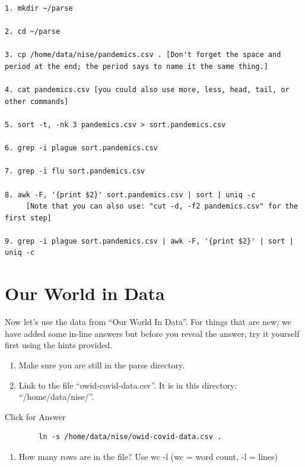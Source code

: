 \documentclass[
]{book}
\providecommand{\tightlist}{%
  \setlength{\itemsep}{0pt}\setlength{\parskip}{0pt}}
\begin{document}
\begin{verbatim}
1. mkdir ~/parse

2. cd ~/parse

3. cp /home/data/nise/pandemics.csv . [Don't forget the space and period at the end; the period says to name it the same thing.]

4. cat pandemics.csv [you could also use more, less, head, tail, or other commands]

5. sort -t, -nk 3 pandemics.csv > sort.pandemics.csv

6. grep -i plague sort.pandemics.csv

7. grep -i flu sort.pandemics.csv

8. awk -F, '{print $2}' sort.pandemics.csv | sort | uniq -c
     [Note that you can also use: "cut -d, -f2 pandemics.csv" for the first step]

9. grep -i plague sort.pandemics.csv | awk -F, '{print $2}' | sort | uniq -c
\end{verbatim}

\hypertarget{our-world-in-data}{%
\section{Our World in Data}\label{our-world-in-data}}

Now let's use the data from ``Our World In Data''. For things that are new, we have added some in-line answers but before you reveal the answer, try it yourself first using the hints provided.

\begin{enumerate}
\def\labelenumi{\arabic{enumi}.}
\setcounter{enumi}{9}
\item
  Make sure you are still in the parse directory.
\item
  Link to the file ``owid-covid-data.csv''. It is in this directory: ``/home/data/nise/''.
\end{enumerate}

Click for Answer

\begin{verbatim}
        ln -s /home/data/nise/owid-covid-data.csv .
\end{verbatim}

\hfill\break

\begin{enumerate}
\def\labelenumi{\arabic{enumi}.}
\setcounter{enumi}{11}
\tightlist
\item
  How many rows are in the file? Use wc -l (wc = word count, -l = lines)
\end{enumerate}
\end{document}
